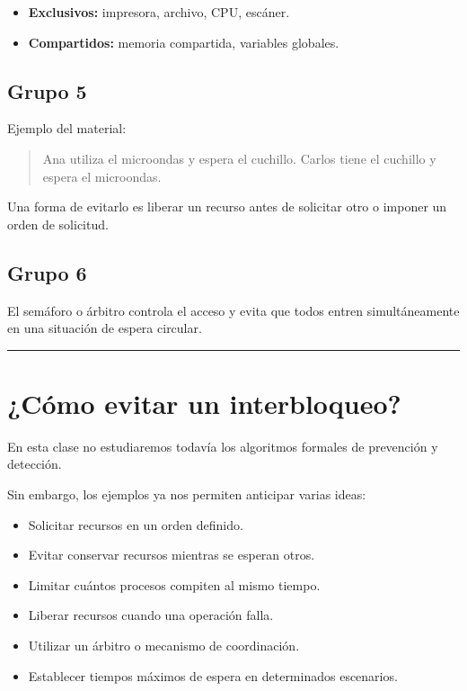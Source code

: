 \documentclass[
  spanish,
  letterpaper,
]{scrbook}
\providecommand{\tightlist}{%
  \setlength{\itemsep}{0pt}\setlength{\parskip}{0pt}}
\begin{document}
\begin{itemize}
\tightlist
\item
  \textbf{Exclusivos:} impresora, archivo, CPU, escáner.
\item
  \textbf{Compartidos:} memoria compartida, variables globales.
\end{itemize}

\section{Grupo 5}\label{grupo-5}

Ejemplo del material:

\begin{quote}
Ana utiliza el microondas y espera el cuchillo. Carlos tiene el cuchillo
y espera el microondas.
\end{quote}

Una forma de evitarlo es liberar un recurso antes de solicitar otro o
imponer un orden de solicitud.

\section{Grupo 6}\label{grupo-6}

El semáforo o árbitro controla el acceso y evita que todos entren
simultáneamente en una situación de espera circular.

\begin{center}\rule{0.5\linewidth}{0.5pt}\end{center}


\chapter{¿Cómo evitar un
interbloqueo?}\label{cuxf3mo-evitar-un-interbloqueo}

En esta clase no estudiaremos todavía los algoritmos formales de
prevención y detección.

Sin embargo, los ejemplos ya nos permiten anticipar varias ideas:

\begin{itemize}
\tightlist
\item
  Solicitar recursos en un orden definido.
\item
  Evitar conservar recursos mientras se esperan otros.
\item
  Limitar cuántos procesos compiten al mismo tiempo.
\item
  Liberar recursos cuando una operación falla.
\item
  Utilizar un árbitro o mecanismo de coordinación.
\item
  Establecer tiempos máximos de espera en determinados escenarios.
\end{itemize}
\end{document}
